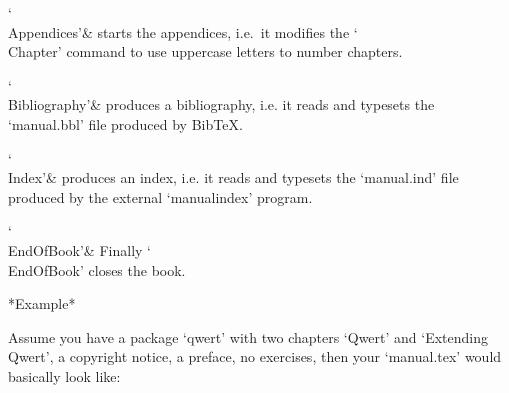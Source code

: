 \indextt{\\Appendices}
`\\Appendices'&
starts the appendices, i.e.~it modifies the `\\Chapter'  command  to  use
uppercase letters to number chapters.

\indextt{\\Bibliography}
`\\Bibliography'&
produces a bibliography, i.e. it reads and typesets the `manual.bbl' file
produced by Bib{\TeX}.

\indextt{\\Index}
`\\Index'&
produces an index, i.e. it  reads  and  typesets  the  `manual.ind'  file
produced by the external `manualindex' program.

\indextt{\\EndOfBook}
`\\EndOfBook'&
Finally `\\EndOfBook' closes the book.

\enditems

*Example*

Assume you have a {\GAP} package `qwert' with two  chapters  `Qwert'  and
`Extending Qwert', a copyright notice, a preface, no exercises, then your
`manual.tex' would basically look like:

\begintt
  \TableOfContents
  \FrontMatter
  \Chapters
  \Appendices
    \Index
\EndOfBook
\endtt

